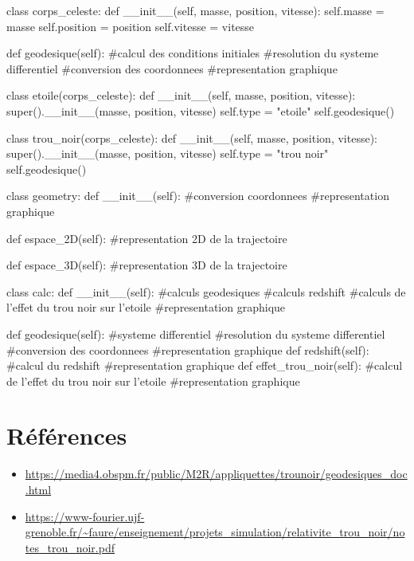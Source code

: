 \documentclass{article}
\begin{document}
\begin{python}
    class corps_celeste:
        def __init__(self, masse, position, vitesse):
            self.masse = masse
            self.position = position
            self.vitesse = vitesse

        def geodesique(self):
            #calcul des conditions initiales
            #resolution du systeme differentiel
            #conversion des coordonnees
            #representation graphique

    class etoile(corps_celeste):
        def __init__(self, masse, position, vitesse):
            super().__init__(masse, position, vitesse)
            self.type = "etoile"
            self.geodesique()
    
    class trou_noir(corps_celeste):
        def __init__(self, masse, position, vitesse):
            super().__init__(masse, position, vitesse)
            self.type = "trou noir"
            self.geodesique()
    
    class geometry:
        def __init__(self):
            #conversion coordonnees
            #representation graphique

        def espace_2D(self):
            #representation 2D de la trajectoire
        
        def espace_3D(self):
            #representation 3D de la trajectoire

    class calc:
        def __init__(self):
            #calculs geodesiques
            #calculs redshift
            #calculs de l'effet du trou noir sur l'etoile
            #representation graphique
        
        def geodesique(self):
            #systeme differentiel
            #resolution du systeme differentiel
            #conversion des coordonnees
            #representation graphique
        def redshift(self):
            #calcul du redshift
            #representation graphique
        def effet_trou_noir(self):
            #calcul de l'effet du trou noir sur l'etoile
            #representation graphique
\end{python}
\newpage
\section{Références}

\begin{itemize}
    \item \url{https://media4.obspm.fr/public/M2R/appliquettes/trounoir/geodesiques_doc.html}
    \item \url{https://www-fourier.ujf-grenoble.fr/~faure/enseignement/projets_simulation/relativite_trou_noir/notes_trou_noir.pdf}
\end{itemize}
\end{document}
